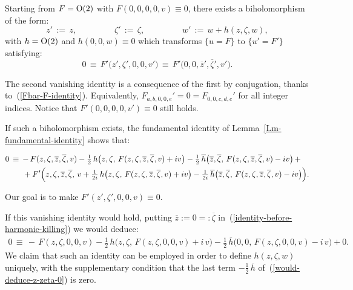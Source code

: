 \documentclass[12pt,twoside,leqno,openany]{amsart}
\begin{document}
\begin{Lemma}
Starting from $F = {\rm O}(2)$ with $F(0,0,0,0,v) \equiv 0$,
there exists a biholomorphism of the form:
\[
z'
\,:=\,
z,
\ \ \ \ \ \ \ \ \ \ \ \ \ \ \ \ \ \ \ \
\zeta'
\,:=\,
\zeta,
\ \ \ \ \ \ \ \ \ \ \ \ \ \ \ \ \ \ \ \
w'
\,:=\,
w+h(z,\zeta,w),
\]
with $h = {\rm O}(2)$ and $h(0,0,w) \equiv 0$ which transforms 
$\{ u = F\}$ to $\{ u' = F' \}$ satisfying:
\[
0
\,\equiv\,
F'\big(z',\zeta',0,0,v'\big)
\,\equiv\,
F'(0,0,\overline{z}',\overline{\zeta}',v'\big).
\]
\end{Lemma}

The second vanishing identity
is a consequence of the first
by conjugation, thanks 
to~({\ref{Fbar-F-identity}}).
Equivalently, $F_{a,b,0,0,e}' = 0 = F_{0,0,c,d,e}'$ for all
integer indices. Notice that
$F'(0,0,0,0,v') \equiv 0$ still holds. 

\proof
If such a biholomorphism exists, the fundamental identity 
of Lemma~{\ref{Lm-fundamental-identity}}
shows that:
\leqnomode{}
\begin{footnotesize}
\begin{align}
\label{identity-before-harmonic-killing}
0
&
\,\equiv\,
-\,
F(z,\zeta,\overline{z},\overline{\zeta},v)
-
{\textstyle{\frac{1}{2}}}\,
h
\big(
z,\zeta,\,
F(z,\zeta,\overline{z},\overline{\zeta},v)
+
iv
\big)
-
{\textstyle{\frac{1}{2}}}\,
\overline{h}
\big(
\overline{z},\overline{\zeta},\,
F(z,\zeta,\overline{z},\overline{\zeta},v)
-
iv
\big)
\,+
\notag
\\
&
\ \ \ \ \
+
F'
\Big(
z,\zeta,\overline{z},\overline{\zeta},\,
v
+
{\textstyle{\frac{1}{2i}}}\,
h
\big(
z,\zeta,\,
F(z,\zeta,\overline{z},\overline{\zeta},v)
+
iv
\big)
-
{\textstyle{\frac{1}{2i}}}\,
\overline{h}
\big(
\overline{z},\overline{\zeta},\,
F(z,\zeta,\overline{z},\overline{\zeta},v)
-
iv
\big)
\Big).
\end{align}
\end{footnotesize}
Our goal is to make $F'(z', \zeta', 0, 0, v) \equiv 0$.

If this vanishing identity would hold, putting  
$\overline{z} := 0 =: \overline{\zeta}$ 
in~({\ref{identity-before-harmonic-killing}}) 
we would deduce:
\leqnomode\usetagform{default}
\begin{align}
\label{would-deduce-z-zeta-0}
0
\,\equiv\,
-\,F(z,\zeta,0,0,v)
-
{\textstyle{\frac{1}{2}}}\,
h\big(
z,\zeta,\,
F(z,\zeta,0,0,v)
+
i\,v
\big)
-
{\textstyle{\frac{1}{2}}}\,
\overline{h}
\big(
0,0,\,
F(z,\zeta,0,0,v)
-
i\,v
\big)
+
0.
\end{align}
We claim that such an identity can be employed in order
to define $h(z, \zeta, w)$ uniquely, with the supplementary
condition that the last term $-\frac{1}{2}\, \overline{h}$
of~({\ref{would-deduce-z-zeta-0}})
is zero.
\end{document}
